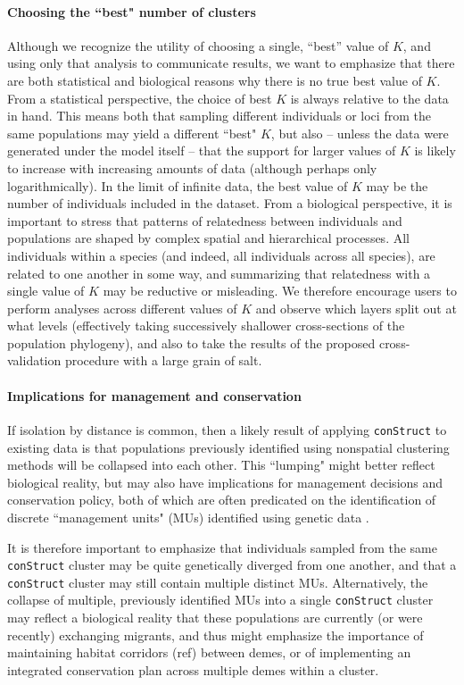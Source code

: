 \documentclass[12pt]{article}
\begin{document}
\paragraph{Choosing the ``best" number of clusters}
Although we recognize the utility of choosing a single, ``best'' value of $K$, 
and using only that analysis to communicate results, 
we want to emphasize that there are both statistical and biological reasons 
why there is no true best value of $K$.
From a statistical perspective, the choice of best $K$ is always relative to the data in hand.
This means both that sampling different individuals or loci 
from the same populations may yield a different ``best" $K$, 
but also 
-- unless the data were generated under the model itself --
that the support for larger values of $K$ is likely to increase with increasing amounts of data
(although perhaps only logarithmically).
In the limit of infinite data, the best value of $K$ 
may be the number of individuals included in the dataset.
From a biological perspective, 
it is important to stress that patterns of relatedness between individuals and populations 
are shaped by complex spatial and hierarchical processes.
All individuals within a species (and indeed, all individuals across all species), 
are related to one another in some way, 
and summarizing that relatedness with a single value of $K$ may be reductive or misleading.
We therefore encourage users to perform analyses across different values of $K$ and 
observe which layers split out at what levels 
(effectively taking successively shallower cross-sections of the population phylogeny),
and also to take the results of the proposed cross-validation procedure with a large grain of salt.

\paragraph{Implications for management and conservation}
If isolation by distance is common, 
then a likely result of applying \texttt{conStruct} to existing data is that 
populations previously identified using nonspatial clustering methods 
will be collapsed into each other.  
This ``lumping" might better reflect biological reality, 
but may also have implications for management decisions and conservation policy, 
both of which are often predicated on the identification of discrete ``management units" (MUs) 
identified using genetic data \citep{Moritz1994,Waples_1998,Moritz_etal_2002}.

It is therefore important to emphasize that individuals sampled from the same \texttt{conStruct} cluster 
may be quite genetically diverged from one another, 
and that a \texttt{conStruct} cluster may still contain multiple distinct MUs.  
Alternatively, the collapse of multiple, previously identified MUs into a single \texttt{conStruct} cluster 
may reflect a biological reality that these populations are currently 
(or were recently) exchanging migrants, 
and thus might emphasize the importance of maintaining habitat corridors (ref) 
between demes, or of implementing an integrated conservation plan across multiple demes within a cluster.
\end{document}
